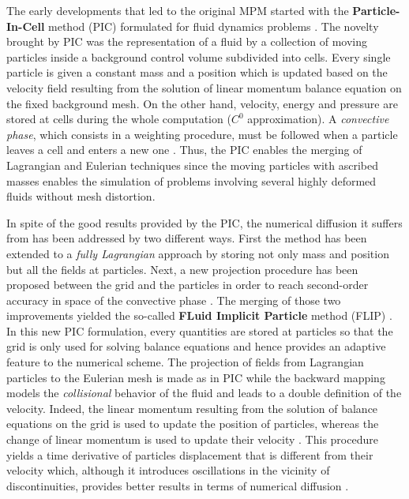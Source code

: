 
The early developments that led to the original MPM started with the \textbf{Particle-In-Cell} method (PIC) formulated for fluid dynamics problems \cite{PIC}. The novelty brought by PIC was the representation of a fluid by a collection of moving particles inside a background control volume subdivided into cells. Every single particle is given a constant mass and a position which is updated based on the velocity field resulting from the solution of linear momentum balance equation on the fixed background mesh. On the other hand, velocity, energy and pressure are stored at cells during the whole computation ($C^0$ approximation). A \textit{convective phase}, which consists in a weighting procedure, must be followed when a particle leaves a cell and enters a new one \cite{PIC}. Thus, the PIC enables the merging of Lagrangian and Eulerian techniques since the moving particles with ascribed masses enables the simulation of problems involving several highly deformed fluids without mesh distortion.

In spite of the good results provided by the PIC, the numerical diffusion it suffers from has been addressed by two different ways. First the method has been extended to a \textit{fully Lagrangian} approach \cite{McCrory_FLIP} by storing not only mass and position but all the fields at particles. Next, a new projection procedure has been proposed between the grid and the particles in order to reach second-order accuracy in space of the convective phase \cite{PIC_Nishiguchi}. The merging of those two improvements yielded the so-called \textbf{FLuid Implicit Particle} method (FLIP) \cite{FLIP}. In this new PIC formulation, every quantities are stored at particles so that the grid is only used for solving balance equations and hence provides an adaptive feature to the numerical scheme. The projection of fields from Lagrangian particles to the Eulerian mesh is made as in PIC while the backward mapping models the \textit{collisional} behavior of the fluid and leads to a double definition of the velocity. Indeed, the linear momentum resulting from the solution of balance equations on the grid is used to update the position of particles, whereas the change of linear momentum is used to update their velocity \cite{Mass_Flip}. This procedure yields a time derivative of particles displacement that is different from their velocity which, although it introduces oscillations in the vicinity of discontinuities, provides better results in terms of numerical diffusion \cite{Mass_Flip}.

